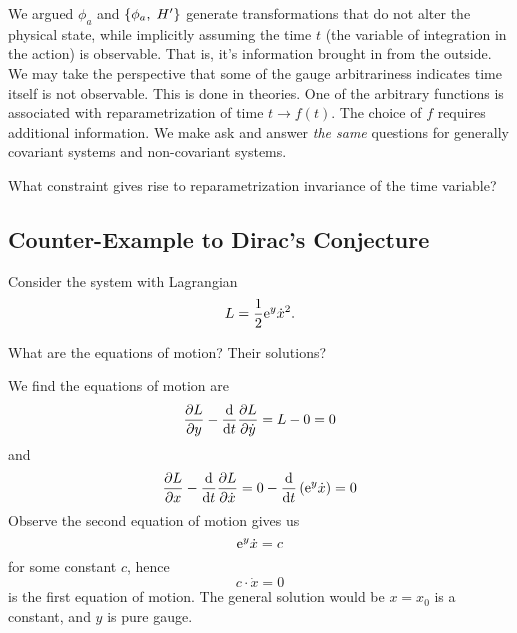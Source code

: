 We argued $\phi_{a}$ and $\left\{\phi_{a},\;H'\right\}$
generate transformations that do not alter the physical state, while implicitly
assuming the time $t$ (the variable of integration in the action) is
observable. That is, it's information brought in from the outside. We
may take the perspective that some of the gauge arbitrariness indicates
time itself is not observable. This is done in 
 theories. One of the arbitrary functions is
associated with reparametrization of time $t\to f(t)$. The choice of $f$
requires additional information. We make ask and answer \emph{the same}
questions for generally covariant systems and non-covariant
systems.

 What constraint gives rise to reparametrization invariance
of the time variable?

\subsection{Counter-Example to Dirac's Conjecture}
Consider the system with Lagrangian
\begin{equation}
L = \frac{1}{2}\mathrm{e}^{y}\dot{x}^{2}.
\end{equation}

 What are the equations of motion? Their solutions?

\begin{soln}
We find the equations of motion are
\begin{equation}
\frac{\partial L}{\partial y} - \frac{\mathrm{d}}{\mathrm{d} t}\frac{\partial L}{\partial\dot{y}}= L - 0 = 0
\end{equation}
and
\begin{equation}
\frac{\partial L}{\partial x} - \frac{\mathrm{d}}{\mathrm{d} t}\frac{\partial L}{\partial\dot{x}}
= 0 -\frac{\mathrm{d}}{\mathrm{d} t}\left(\mathrm{e}^{y}\dot{x}\right) = 0
\end{equation}
Observe the second equation of motion gives us
\begin{equation}
\mathrm{e}^{y}\dot{x} = c
\end{equation}
for some constant $c$, hence
\begin{equation}
c\cdot\dot{x} = 0
\end{equation}
is the first equation of motion. The general solution would be $x=x_{0}$
is a constant, and $y$ is pure gauge.
\end{soln}

